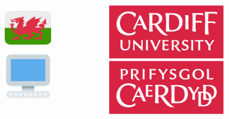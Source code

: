 \documentclass{beamer}
\begin{document}
\begin{frame}
  \begin{columns}
    \begin{column}{0.5\textwidth}
      \begin{center}
        \includegraphics[width=0.5\textwidth]{cy}\\
        \vspace{7mm}
        \includegraphics[width=0.5\textwidth]{comp}\\
      \end{center}
    \end{column}
    \begin{column}{0.5\textwidth}
      \begin{center}
        \begin{center}
          \includegraphics[width=0.6\textwidth]{cflogo}

\end{center}
\end{center}
\end{column}
\end{columns}
\end{frame}
\end{document}
